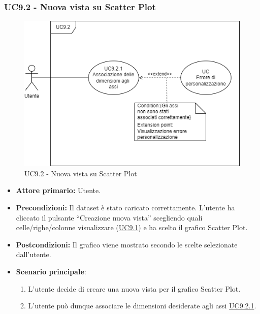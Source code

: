 \subsubsection{UC9.2 - Nuova vista su Scatter Plot}
\label{sec:UC9.2}
\begin{figure}[h!]
	\centering
	\includegraphics[scale=0.55]{../../assets/creazionevista_scatter_plot.png}
	\caption{UC9.2 - Nuova vista su Scatter Plot}
\end{figure}
\begin{itemize}
    \item \textbf{Attore primario:} Utente.
    \item \textbf{Precondizioni:} Il dataset è stato caricato correttamente. L'utente ha cliccato il pulsante ``Creazione nuova vista'' scegliendo quali celle/righe/colonne visualizzare (\hyperref[sec:UC9.1]{UC9.1}) e ha scelto il grafico Scatter Plot.
    \item \textbf{Postcondizioni:} Il grafico viene mostrato secondo le scelte selezionate dall'utente.
    \item \textbf{Scenario principale}:
    \begin{enumerate}
		\item L'utente decide di creare una nuova vista per il grafico Scatter Plot.
		\item L'utente può dunque associare le dimensioni desiderate agli assi \hyperref[sec:UC9.2.1]{UC9.2.1}.
	\end{enumerate}
\end{itemize}

